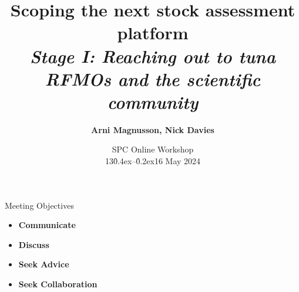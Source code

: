 \documentclass[aspectratio=169]{beamer}
\begin{document}
\begin{frame}
  \title{\vspace{-5ex}\darkblue Scoping the next stock assessment
    platform\\[2ex]
    \it\large\darkgray
    Stage I: Reaching out to tuna RFMOs and the scientific community}
  \author{\vspace{-10ex}\darkgray\bf
    Arni Magnusson, Nick Davies}
  \date{\darkgreen SPC Online Workshop\\[0.5ex]
    13\h{0.4ex}--\h{0.2ex}16 May 2024}
  \titlepage
\end{frame}


\begin{frame}{Meeting Objectives}
  \begin{itemize}
    \item[] {\bf\darkblue Communicate} \\[5ex]
    \item[] {\bf\darkblue Discuss} \\[5ex]
    \item[] {\bf\darkblue Seek Advice} \\[5ex]
    \item[] {\bf\darkblue Seek Collaboration} \\[1ex]
  \end{itemize}
\end{frame}

\end{document}
